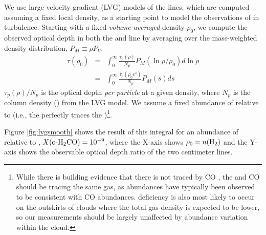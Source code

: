 We use large velocity gradient (LVG) models of the \formaldehyde lines, which are computed assuming a
fixed local density, as a starting point to model the observations of
\formaldehyde in turbulence.   Starting with a fixed \emph{volume-averaged}
density $\rho_0$, we compute the observed \formaldehyde optical depth in both
the \oneone and \twotwo
line by averaging over the mass-weighted density distribution, $P_M\equiv\rho P_V$.
\begin{eqnarray}
    \label{eqn:tauintegral}
    \tau(\rho_0) &=& \int_{0}^\infty \frac{\tau_p(\rho)}{N_p} P_M(\ln \rho/\rho_0) d \ln \rho\\
                 &=& \int_{0}^\infty \frac{\tau_p(\rho_0 e^s)}{N_p} P_M(s) d s
\end{eqnarray} %
$\tau_p(\rho)/N_p$ is the optical depth \emph{per particle} at a given density, where $N_p$ is the column
density (\perkmspc) from the LVG model.
We assume a fixed abundance of \ortho relative to \hh
(i.e., the \formaldehyde perfectly traces the \hh)\footnote{While there is
building evidence that there is \hh not traced by CO
\citep{Shetty2011b,Shetty2011a}, the \formaldehyde and CO should be tracing the
same gas, as \formaldehyde abundances have typically been observed to be
consistent with CO abundances.  \formaldehyde deficiency is also most likely to
occur on the outskirts of clouds where the total gas density is expected to be
lower, so our measurements should be largely unaffected by abundance variation
within the cloud.}.

Figure \ref{fig:lvgsmooth}
shows the result of this integral for an abundance of \ortho relative to \hh, 
$X(\textrm{o-H}_2\textrm{CO})=10^{-9}$, where the X-axis shows $\rho_0 = n(\textrm{H}_{2})$ and the Y-axis
shows the observable optical depth ratio of the two \formaldehyde centimeter
lines.

%
%



